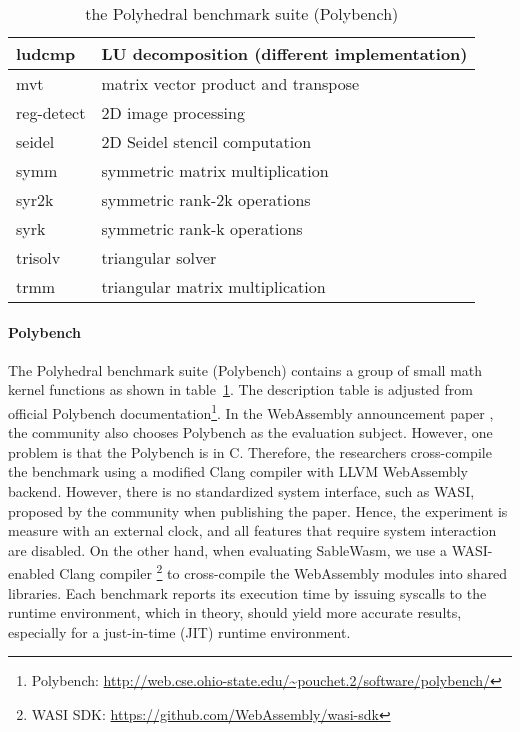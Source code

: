 \begin{table}
\begin{tabular}{|l|l|}
        ludcmp                  & LU decomposition (different implementation)         \\ \hline
        mvt                     & matrix vector product and transpose                 \\ \hline
        reg-detect              & 2D image processing                                 \\ \hline
        seidel                  & 2D Seidel stencil computation                       \\ \hline
        symm                    & symmetric matrix multiplication                     \\ \hline
        syr2k                   & symmetric rank-2k operations                        \\ \hline
        syrk                    & symmetric rank-k operations                         \\ \hline
        trisolv                 & triangular solver                                   \\ \hline
        trmm                    & triangular matrix multiplication                    \\ \hline
    \end{tabular}
    \caption{the Polyhedral benchmark suite (Polybench)}
    \label{tbl:polybench}
\end{table}

\paragraph{Polybench}
The Polyhedral benchmark suite (Polybench) \cite{polybench} contains a group of small math kernel functions as shown in table~\ref{tbl:polybench}. The description table is adjusted from official Polybench documentation\footnote{Polybench: \url{http://web.cse.ohio-state.edu/~pouchet.2/software/polybench/}}. In the WebAssembly announcement paper \cite{10.1145/3062341.3062363}, the community also chooses Polybench as the evaluation subject. However, one problem is that the Polybench is in C. Therefore, the researchers cross-compile the benchmark using a modified Clang compiler with LLVM WebAssembly backend. However, there is no standardized system interface, such as WASI, proposed by the community when publishing the paper. Hence, the experiment is measure with an external clock, and all features that require system interaction are disabled. On the other hand, when evaluating SableWasm, we use a WASI-enabled Clang compiler \footnote{WASI SDK: \url{https://github.com/WebAssembly/wasi-sdk}} to cross-compile the WebAssembly modules into shared libraries. Each benchmark reports its execution time by issuing syscalls to the runtime environment, which in theory, should yield more accurate results, especially for a just-in-time (JIT) runtime environment.

